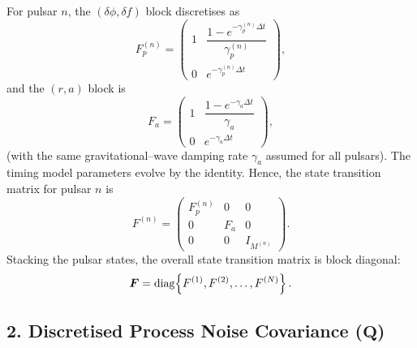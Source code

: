 \documentclass[]{scrartcl}
\begin{document}
	For pulsar $n$, the \((\delta\phi,\delta f)\) block discretises as
	\begin{equation}
		F_p^{(n)} = \begin{pmatrix}
			1 & \dfrac{1-e^{-\gamma_p^{(n)}\Delta t}}{\gamma_p^{(n)}} \\[1mm]
			0 & e^{-\gamma_p^{(n)}\Delta t}
		\end{pmatrix},
	\end{equation}
	and the \((r,a)\) block is
	\begin{equation}
		F_a = \begin{pmatrix}
			1 & \dfrac{1-e^{-\gamma_a\Delta t}}{\gamma_a} \\[1mm]
			0 & e^{-\gamma_a\Delta t}
		\end{pmatrix},
	\end{equation}
	(with the same gravitational–wave damping rate $\gamma_a$ assumed for all pulsars). The timing model parameters evolve by the identity. Hence, the state transition matrix for pulsar $n$ is
	\begin{equation}
		F^{(n)} = \begin{pmatrix}
			F_p^{(n)} & 0 & 0\\[2mm]
			0 & F_a & 0\\[2mm]
			0 & 0 & I_{M^{(n)}}
		\end{pmatrix}.
	\end{equation}
	Stacking the pulsar states, the overall state transition matrix is block diagonal:
	\begin{equation}
		\boldsymbol{F} = \mathrm{diag}\Bigl\{F^{(1)},F^{(2)},\ldots,F^{(N)}\Bigr\}\,.
	\end{equation}
	
	\subsection*{2. Discretised Process Noise Covariance (\(\boldsymbol{Q}\))}
	
\end{document}
